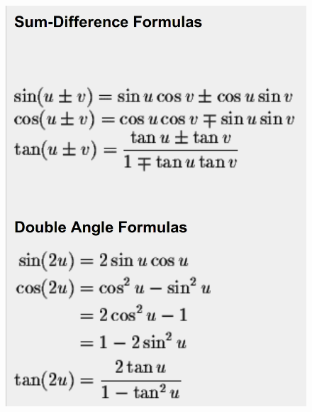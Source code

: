     \begin{figure}[H]
        \centering
        \includegraphics[scale=0.2]{img/trig2.png}
    \end{figure}
